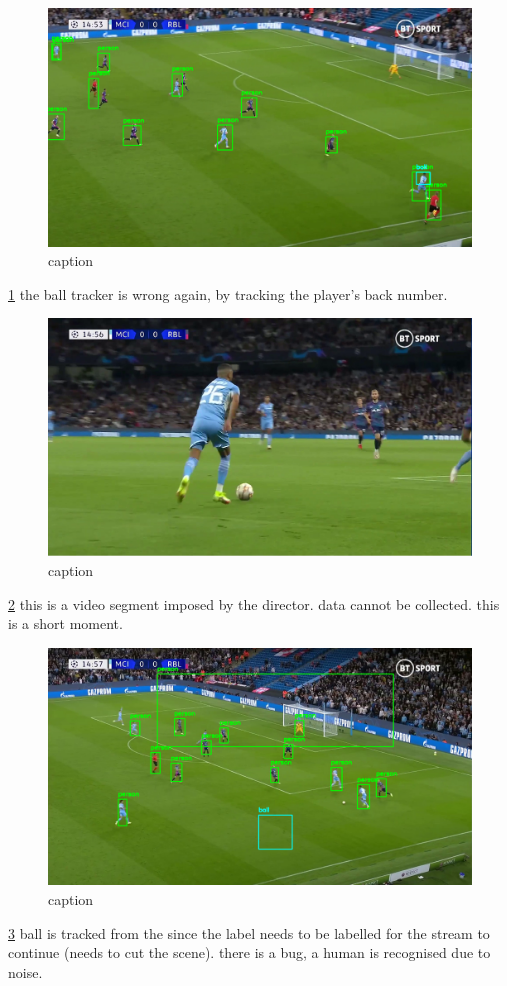 \documentclass[
11pt,
twoside
]{report}
\begin{document}
\begin{figure}[H]
    \includegraphics[keepaspectratio, width=\columnwidth]{Screenshot_2022-03-03_23-06-18.png}
    \caption{caption}
    \label{img:9}
\end{figure}
\ref{img:9} the ball
tracker is wrong again, by tracking the player's back number.

\begin{figure}[H]
    \includegraphics[keepaspectratio, width=\columnwidth]{Screenshot_2022-03-03_21-39-53.png}
    \caption{caption}
    \label{img:10}
\end{figure}
\ref{img:10} this is a
video segment imposed by the director. data cannot be collected. this is
a short moment.

\begin{figure}[H]
    \includegraphics[keepaspectratio, width=\columnwidth]{Screenshot_2022-03-03_23-06-43.png}
    \caption{caption}
    \label{img:11}
\end{figure}
\ref{img:11} ball is
tracked from the since the label needs to be labelled for the stream to
continue (needs to cut the scene). there is a bug, a human is recognised
due to noise.
\end{document}
